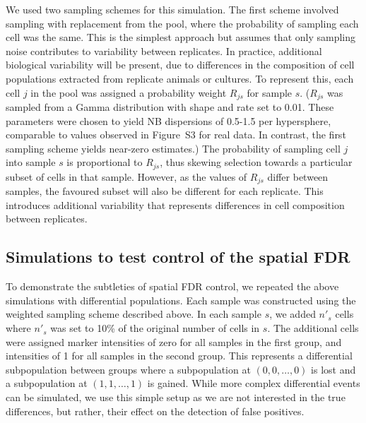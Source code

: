 \documentclass{article}
\newcommand{\suppfignbdisp}{S3}
\begin{document}
We used two sampling schemes for this simulation.
The first scheme involved sampling with replacement from the pool, where the probability of sampling each cell was the same.
This is the simplest approach but assumes that only sampling noise contributes to variability between replicates.
In practice, additional biological variability will be present, due to differences in the composition of cell populations extracted from replicate animals or cultures.
To represent this, each cell $j$ in the pool was assigned a probability weight $R_{js}$ for sample $s$.
($R_{js}$ was sampled from a Gamma distribution with shape and rate set to 0.01.
These parameters were chosen to yield NB dispersions of 0.5-1.5 per hypersphere, comparable to values observed in Figure~\suppfignbdisp{} for real data.
In contrast, the first sampling scheme yields near-zero estimates.)
The probability of sampling cell $j$ into sample $s$ is proportional to $R_{js}$, thus skewing selection towards a particular subset of cells in that sample.
However, as the values of $R_{js}$ differ between samples, the favoured subset will also be different for each replicate.
This introduces additional variability that represents differences in cell composition between replicates. 

\subsection{Simulations to test control of the spatial FDR}
To demonstrate the subtleties of spatial FDR control, we repeated the above simulations with differential populations.
Each sample was constructed using the weighted sampling scheme described above.
In each sample $s$, we added $n'_s$ cells where $n'_s$ was set to 10\% of the original number of cells in $s$.
The additional cells were assigned marker intensities of zero for all samples in the first group, and intensities of 1 for all samples in the second group.
This represents a differential subpopulation between groups where a subpopulation at $(0,0, \ldots, 0)$ is lost and a subpopulation at $(1, 1, \ldots, 1)$ is gained.
While more complex differential events can be simulated, we use this simple setup as we are not interested in the true differences, but rather, their effect on the detection of false positives.
\end{document}
